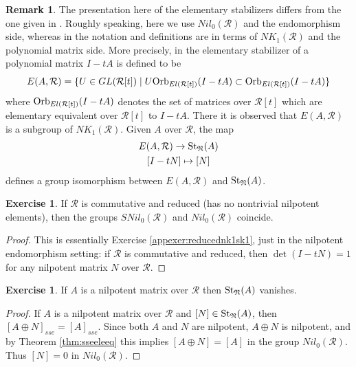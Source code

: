 \documentclass{amsart}
\newcommand{\si}{\index}
\theoremstyle{definition}
\newtheorem{rem}[equation]{Remark}
\newtheorem{exer}[equation]{Exercise}
\theoremstyle{definition}
\newcommand{\calR}{\mathcal{R}}
\newcommand{\sta}{\textnormal{St}}
\numberwithin{equation}{subsection}
\begin{document}
\begin{rem}\label{apprem:elstnotation}
The presentation here of the elementary stabilizers differs from the one given in \cite{BoSc1}. Roughly speaking, here we use $Nil_{0}(\calR)$ and the endomorphism side, whereas in \cite{BoSc1} the notation and definitions are in terms of $NK_{1}(\calR)$ and the polynomial matrix side. More precisely, in \cite{BoSc1} the elementary stabilizer of a polynomial matrix $I-tA$ is defined to be
$$E(A,\calR) =  \{U \in GL(\calR[t]) \mid U\textnormal{Orb}_{El(\calR[t])}(I-tA) \subset \textnormal{Orb}_{El(\calR[t])}(I-tA)\}$$
where $\textnormal{Orb}_{El(\calR[t])}(I-tA)$ denotes the set of matrices over $\calR[t]$ which are elementary equivalent\si{elementary equivalence} over $\calR[t]$ to $I-tA$. There it is observed that $E(A,\calR)$ is a subgroup of $NK_{1}(\calR)$. Given $A$ over $\calR$, the map
\begin{equation}
\begin{gathered}
E(A,\calR) \to \sta_{\mathfrak{N}}(A)\\
[I-tN] \mapsto [N]
\end{gathered}
\end{equation}
defines a group isomorphism between $E(A,\calR)$ and $\sta_{\mathfrak{N}}(A)$.
\end{rem}

\begin{exer}\label{appex:redsnil0}
If $\calR$ is commutative and reduced (has no nontrivial nilpotent elements), then the groups $SNil_{0}(\calR)$ and $Nil_{0}(\calR)$ coincide.
\end{exer}
\begin{proof}
This is essentially Exercise \ref{appexer:reducednk1sk1}, just in the nilpotent endomorphism setting: if $\calR$ is commutative and reduced, then $\det(I-tN)=1$ for any nilpotent matrix $N$ over $\calR$.
\end{proof}

\begin{exer}\label{appex:nilstvanish}
If $A$ is a nilpotent matrix over $\calR$ then $\sta_{\mathfrak{N}}(A)$ vanishes.
\end{exer}
\begin{proof}
If $A$ is a nilpotent matrix over $\calR$ and $[N] \in \sta_{\mathfrak{N}}(A)$, then $[A \oplus N]_{sse} = [A]_{sse}$. Since both $A$ and $N$ are nilpotent, $A \oplus N$ is nilpotent, and by Theorem \ref{thm:sseeleeq} this implies $[A \oplus N] = [A]$ in the group $Nil_{0}(\calR)$. Thus $[N]=0$ in $Nil_{0}(\calR)$.
\end{proof}
\end{document}
